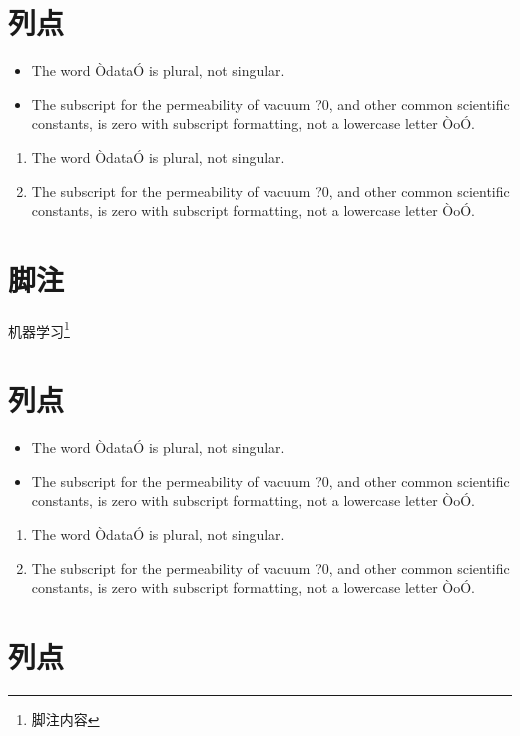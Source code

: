 \documentclass[letterpaper, 10 pt, conference]{ieeeconf}
\begin{document}
\section{列点}

\begin{itemize}
\item The word ÒdataÓ is plural, not singular.
\item The subscript for the permeability of vacuum ?0, and other common scientific constants, is zero with subscript formatting, not a lowercase letter ÒoÓ.
\end{itemize}

\begin{enumerate}
\item The word ÒdataÓ is plural, not singular.
\item The subscript for the permeability of vacuum ?0, and other common scientific constants, is zero with subscript formatting, not a lowercase letter ÒoÓ.
\end{enumerate}


\section{脚注}
机器学习\footnote{脚注内容}

\section{列点}

\begin{itemize}
\item The word ÒdataÓ is plural, not singular.
\item The subscript for the permeability of vacuum ?0, and other common scientific constants, is zero with subscript formatting, not a lowercase letter ÒoÓ.
\end{itemize}

\begin{enumerate}
\item The word ÒdataÓ is plural, not singular.
\item The subscript for the permeability of vacuum ?0, and other common scientific constants, is zero with subscript formatting, not a lowercase letter ÒoÓ.
\end{enumerate}


\section{列点}
\end{document}
